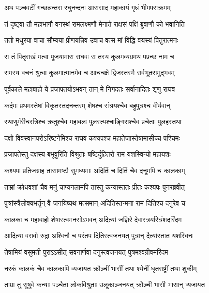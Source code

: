 
\twolineshloka
{अथ पञ्चवटीं गच्छन्नन्तरा रघुनन्दनः}
{आससाद महाकायं गृध्रं भीमपराक्रमम्} %

\twolineshloka
{तं दृष्ट्वा तौ महाभागौ वनस्थं रामलक्ष्मणौ}
{मेनाते राक्षसं पक्षिं ब्रुवाणौ को भवानिति} %

\twolineshloka
{ततो मधुरया वाचा सौम्यया प्रीणयन्निव}
{उवाच वत्स मां विद्धि वयस्यं पितुरात्मनः} %

\twolineshloka
{स तं पितृसखं मत्वा पूजयामास राघवः}
{स तस्य कुलमव्यग्रमथ पप्रच्छ नाम च} %

\twolineshloka
{रामस्य वचनं श्रुत्वा कुलमात्मानमेव च}
{आचचक्षे द्विजस्तस्मै सर्वभूतसमुद्भवम्} %

\twolineshloka
{पूर्वकाले महाबाहो ये प्रजापतयोऽभवन्}
{तान् मे निगदतः सर्वानादितः शृणु राघव} %

\twolineshloka
{कर्दमः प्रथमस्तेषां विकृतस्तदनन्तरम्}
{शेषश्च संश्रयश्चैव बहुपुत्रश्च वीर्यवान्} %

\twolineshloka
{स्थाणुर्मरीचरत्रिश्च क्रतुश्चैव महाबलः}
{पुलस्त्यश्चाङ्गिराश्चैव प्रचेताः पुलहस्तथा} %

\twolineshloka
{दक्षो विवस्वानपरोऽरिष्टनेमिश्च राघव}
{कश्यपश्च महातेजास्तेषामासीच्च पश्चिमः} %

\twolineshloka
{प्रजापतेस्तु दक्षस्य बभूवुरिति विश्रुताः}
{षष्टिर्दुहितरो राम यशस्विन्यो महायशः} %

\twolineshloka
{कश्यपः प्रतिजग्राह तासामष्टौ सुमध्यमाः}
{अदितिं च दितिं चैव दनूमपि च कालकाम्} %

\twolineshloka
{ताम्रां क्रोधवशां चैव मनुं चाप्यनलामपि}
{तास्तु कन्यास्ततः प्रीतः कश्यपः पुनरब्रवीत्} %

\twolineshloka
{पुत्रांस्त्रैलोक्यभर्तॄन् वै जनयिष्यथ मत्समान्}
{अदितिस्तन्मना राम दितिश्च दनुरेव च} %

\twolineshloka
{कालका च महाबाहो शेषास्त्वमनसोऽभवन्}
{अदित्यां जज्ञिरे देवास्त्रयस्त्रिंशदरिंदम} %

\twolineshloka
{आदित्या वसवो रुद्रा अश्विनौ च परंतप}
{दितिस्त्वजनयत् पुत्रान् दैत्यांस्तात यशस्विनः} %

\twolineshloka
{तेषामियं वसुमती पुराऽऽसीत् सवनार्णवा}
{दनुस्त्वजनयत् पुत्रमश्वग्रीवमरिंदम} %

\twolineshloka
{नरकं कालकं चैव कालकापि व्यजायत}
{क्रौञ्चीं भासीं तथा श्येनीं धृतराष्ट्रीं तथा शुकीम्} %

\twolineshloka
{ताम्रा तु सुषुवे कन्याः पञ्चैता लोकविश्रुताः}
{उलूकाञ्जनयत् क्रौञ्ची भासी भासान् व्यजायत} %

